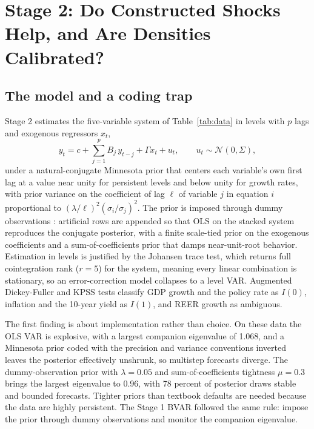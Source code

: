 \documentclass[conference]{IEEEtran}
\begin{document}
\section{Stage 2: Do Constructed Shocks Help, and Are Densities Calibrated?}

\subsection{The model and a coding trap}
Stage 2 estimates the five-variable system of Table~\ref{tab:data} in levels with $p$ lags and exogenous regressors $x_t$,
\begin{equation}
y_t = c + \sum_{j=1}^{p} B_j\,y_{t-j} + \Gamma x_t + u_t,\qquad u_t\sim\mathcal{N}(0,\Sigma),
\end{equation}
under a natural-conjugate Minnesota prior \cite{litterman1986} that centers each variable's own first lag at a value near unity for persistent levels and below unity for growth rates, with prior variance on the coefficient of lag $\ell$ of variable $j$ in equation $i$ proportional to $(\lambda/\ell)^2(\sigma_i/\sigma_j)^2$. The prior is imposed through dummy observations \cite{bgr2010,sims1998}: artificial rows are appended so that OLS on the stacked system reproduces the conjugate posterior, with a finite scale-tied prior on the exogenous coefficients and a sum-of-coefficients prior that damps near-unit-root behavior. Estimation in levels is justified by the Johansen trace test, which returns full cointegration rank ($r=5$) for the system, meaning every linear combination is stationary, so an error-correction model collapses to a level VAR. Augmented Dickey-Fuller and KPSS tests classify GDP growth and the policy rate as $I(0)$, inflation and the 10-year yield as $I(1)$, and REER growth as ambiguous.

The first finding is about implementation rather than choice. On these data the OLS VAR is explosive, with a largest companion eigenvalue of 1.068, and a Minnesota prior coded with the precision and variance conventions inverted leaves the posterior effectively unshrunk, so multistep forecasts diverge. The dummy-observation prior with $\lambda=0.05$ and sum-of-coefficients tightness $\mu=0.3$ brings the largest eigenvalue to 0.96, with 78 percent of posterior draws stable and bounded forecasts. Tighter priors than textbook defaults are needed because the data are highly persistent. The Stage 1 BVAR followed the same rule: impose the prior through dummy observations and monitor the companion eigenvalue.
\end{document}
